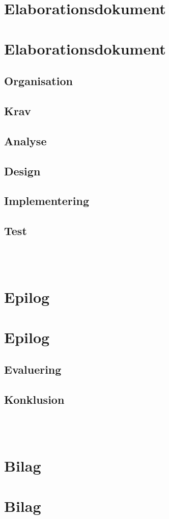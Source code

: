 \documentclass[]{report}
\newcommand*\parttitle{}
\let\origpart\part
\renewcommand*{\part}[2][]{%
    \ifx\\#1\\%
    \origpart{#2}%
    \renewcommand*\parttitle{#2}%
    \else
    \origpart[#1]{#2}%
    \renewcommand*\parttitle{#1}%
    \fi
    }
\begin{document}
    \part{Elaborationsdokument} \thispagestyle{fancy}
    
    \chapter{Organisation}
    
    \chapter{Krav} \label{Krav}
    
    \chapter{Analyse}
    
    \chapter{Design}
    
    \chapter{Implementering} \label{Implementering}
    
    \chapter{Test}
    
    
    \part{Epilog} \thispagestyle{fancy}
    
    \chapter{Evaluering}
    
    \chapter{Konklusion}
    
    
    
    
    \part{Bilag} \thispagestyle{fancy}
    
    
    
    
    
    
    
\end{document}
